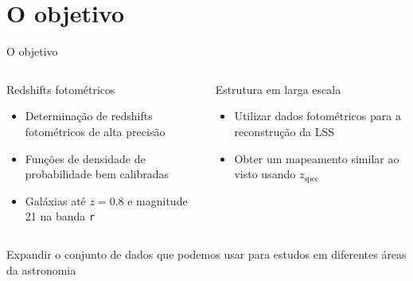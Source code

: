 \section{O objetivo}
\begin{frame}[c]{O objetivo}
    \begin{columns}[c]
        \begin{column}{0.46\linewidth}
            \begin{splusbox}{Redshifts fotométricos}
                \begin{itemize}
                    \justifying
                    \item Determinação de redshifts fotométricos de alta precisão
                    \item Funções de densidade de probabilidade bem calibradas
                    \item Galáxias até $z=0.8$ e magnitude 21 na banda \texttt{r}
                \end{itemize}
            \end{splusbox}
        \end{column}
        \begin{column}{0.46\linewidth}
            \begin{splusbox}{Estrutura em larga escala}
                \begin{itemize}
                    \justifying
                    \item Utilizar dados fotométricos para a reconstrução da LSS
                    \item Obter um mapeamento similar ao visto usando $z_\text{spec}$
                \end{itemize}
            \end{splusbox}
        \end{column}
    \end{columns}

    \centering
    \begin{splusbox}{}
        Expandir o conjunto de dados que podemos usar para estudos em diferentes áreas da astronomia
    \end{splusbox}
\end{frame}

